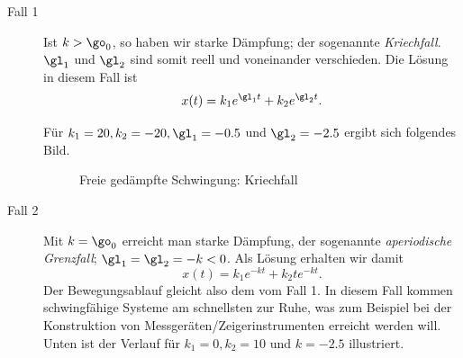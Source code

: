 \documentclass[%
draft,
11pt,%
twoside,%
titlepage,%
german,%
headsepline%
]{scrartcl}
\begin{document}
\begin{description}
\item[Fall 1] Ist $k>\go_0$, so haben wir starke D\"ampfung; der sogenannte \emph{Kriechfall}. $\gl_1$ und $\gl_2$ sind somit reell und voneinander verschieden. Die L\"osung in diesem Fall ist
$$x(t)=k_1e^{\gl_1 t}+k_2e^{\gl_2 t}.$$

F\"ur $k_1=20, k_2=-20,\gl_1=-0.5$ und $\gl_2=-2.5$ ergibt sich folgendes Bild.

\begin{figure}
\begin{center}
\end{center}
\caption{Freie ged\"ampfte Schwingung: Kriech\-fall}
\end{figure}

\item[Fall 2] Mit $k=\go_0$ erreicht man starke D\"ampfung,  der sogenannte \emph{aperiodische Grenzfall}; $\gl_1=\gl_2=-k<0$.
Als L\"osung erhalten wir damit
$$x(t)=k_1e^{-kt}+k_2te^{-kt}.$$
Der Bewegungsablauf gleicht also dem vom Fall 1. In diesem Fall kommen schwingf\"ahige Systeme am schnellsten zur Ruhe, was zum Beispiel bei der Konstruktion von Messger\"aten/Zeigerinstrumenten erreicht werden will. Unten ist der Verlauf f\"ur $k_1=0, k_2=10$ und $k=-2.5$ illustriert.


\end{description}
\end{document}
